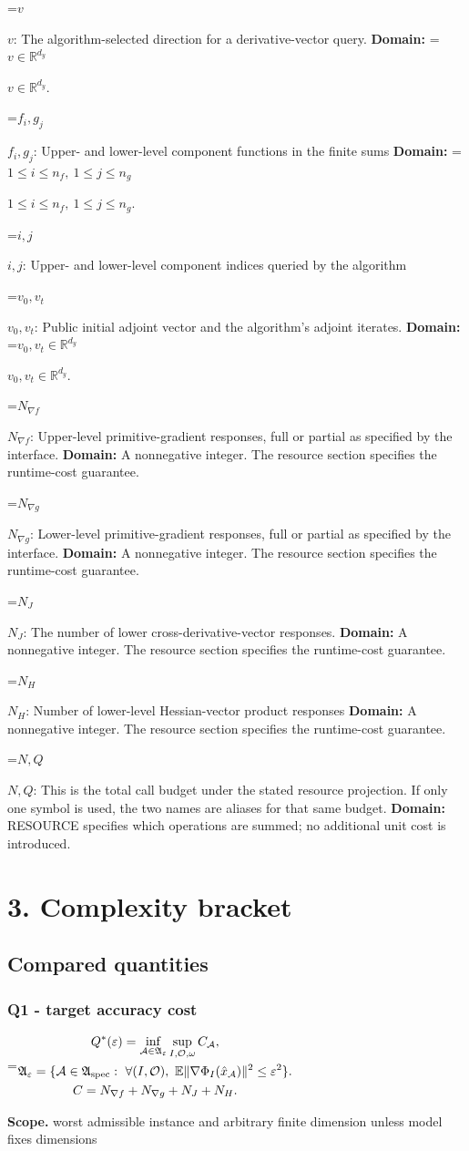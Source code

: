\documentclass[10pt,a4paper]{article}
\newcommand{\AtlasMath}[1]{\par\begingroup\centering\setbox0=\hbox{$\displaystyle #1$}\ifdim\wd0>1.4\linewidth\typeout{ATLAS WIDE FORMULA: \the\wd0}\fi\ifdim\wd0>\linewidth\resizebox{\linewidth}{!}{\box0}\else\box0\fi\par\endgroup}
\newcommand{\AtlasInlineMath}[1]{\begingroup\setbox0=\hbox{$#1$}\ifdim\wd0>.4\linewidth\endgroup\AtlasMath{#1}\else\endgroup$#1$\fi}
\begin{document}
\AtlasInlineMath{v}: The algorithm-selected direction for a derivative-vector query. \textbf{Domain:} \AtlasInlineMath{v\in\mathbb R^{d_y}}.

\AtlasInlineMath{f_i,g_j}: Upper- and lower-level component functions in the finite sums \textbf{Domain:} \AtlasInlineMath{1\le i\le n_f,\ 1\le j\le n_g}.

\AtlasInlineMath{i,j}: Upper- and lower-level component indices queried by the algorithm

\AtlasInlineMath{v_0,v_t}: Public initial adjoint vector and the algorithm's adjoint iterates. \textbf{Domain:} \AtlasInlineMath{v_0,v_t\in\mathbb R^{d_y}}.

\AtlasInlineMath{N_{\nabla f}}: Upper-level primitive-gradient responses, full or partial as specified by the interface. \textbf{Domain:} A nonnegative integer. The resource section specifies the runtime-cost guarantee.

\AtlasInlineMath{N_{\nabla g}}: Lower-level primitive-gradient responses, full or partial as specified by the interface. \textbf{Domain:} A nonnegative integer. The resource section specifies the runtime-cost guarantee.

\AtlasInlineMath{N_J}: The number of lower cross-derivative-vector responses. \textbf{Domain:} A nonnegative integer. The resource section specifies the runtime-cost guarantee.

\AtlasInlineMath{N_H}: Number of lower-level Hessian-vector product responses \textbf{Domain:} A nonnegative integer. The resource section specifies the runtime-cost guarantee.

\AtlasInlineMath{N,Q}: This is the total call budget under the stated resource projection. If only one symbol is used, the two names are aliases for that same budget. \textbf{Domain:} RESOURCE specifies which operations are summed; no additional unit cost is introduced.

\section{3. Complexity bracket}
\subsection{Compared quantities}
\subsubsection{Q1 - target accuracy cost}
\AtlasMath{\begin{gathered}Q^*(\varepsilon)=\inf_{\mathcal A\in\mathfrak A_\varepsilon}\sup_{I,\mathcal O,\omega}C_{\mathcal A},\\\mathfrak A_\varepsilon=\{\mathcal A\in\mathfrak A_{\rm spec}:\ \forall(I,\mathcal O),\ \mathbb E\|\nabla\Phi_I(\hat x_{\mathcal A})\|^2\le\varepsilon^2\}.\\C=N_{\nabla f}+N_{\nabla g}+N_J+N_H.\end{gathered}}
\textbf{Scope.} worst admissible instance and arbitrary finite dimension unless model fixes dimensions
\end{document}
